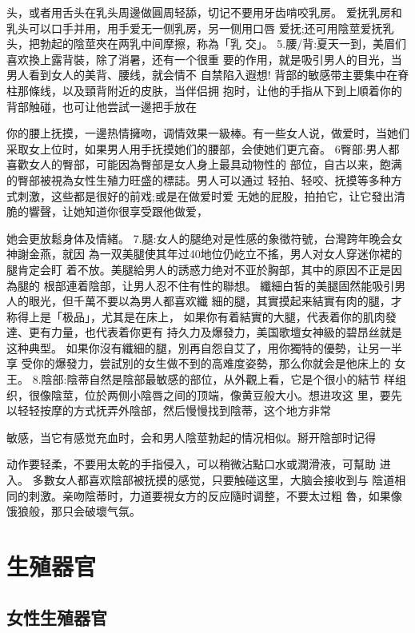 \documentclass[12pt,UTF8]{ctexbook}
\begin{document}
头，或者用舌头在乳头周邊做圓周轻舔，切记不要用牙齿啃咬乳房。
爱抚乳房和乳头可以口手并用，用手爱无一侧乳房，另一侧用口唇
爱抚;还可用陰莖爱抚乳头，把勃起的陰莖夾在两乳中间摩擦，称為「乳
交」。
5.腰/背:夏天一到，美眉们喜欢換上露背裝，除了消暑，还有一个很重
要的作用，就是吸引男人的目光，当男人看到女人的美背、腰线，就会情不
自禁陷入遐想!
背部的敏感带主要集中在脊柱那條线，以及頸背附近的皮肤，当伴侣拥
抱时，让他的手指从下到上順着你的背部触碰，也可让他尝試一邊把手放在

你的腰上抚摸，一邊热情擁吻，调情效果一級棒。有一些女人说，做爱时，当她们采取女上位时，如果男人用手抚摸她们的腰部，会使她们更亢奋。
6臀部:男人都喜歡女人的臀部，可能因為臀部是女人身上最具动物性的
部位，自古以来，飽满的臀部被視為女性生殖力旺盛的標誌。男人可以通过
轻拍、轻咬、抚摸等多种方式刺激，这些都是很好的前戏;或是在做爱时爱
无她的屁股，拍拍它，让它發出清脆的響聲，让她知道你很享受跟他做爱，

她会更放鬆身体及情緒。
7.腿:女人的腿绝对是性感的象徵符號，台灣跨年晚会女神謝金燕，就因
為一双美腿使其年过40地位仍屹立不搖，男人对女人穿迷你裙的腿肯定会盯
着不放。美腿給男人的誘惑力绝对不亚於胸部，其中的原因不正是因為腿的
根部連着陰部，让男人忍不住有性的聯想。
纖細白皙的美腿固然能吸引男人的眼光，但千萬不要以為男人都喜欢纖
細的腿，其實摸起来結實有肉的腿，才称得上是「极品」，尤其是在床上，
如果你有着結實的大腿，代表着你的肌肉發達、更有力量，也代表着你更有
持久力及爆發力，美国歌壇女神級的碧昂丝就是这种典型。
如果你沒有纖細的腿，別再自怨自艾了，用你獨特的優勢，让另一半享
受你的爆發力，尝試別的女生做不到的高难度姿勢，那么你就会是他床上的
女王。
8.陰部:陰蒂自然是陰部最敏感的部位，从外觀上看，它是个很小的結节
样组织，很像陰莖，位於两侧小陰唇之间的顶端，像黄豆般大小。想进攻这
里，要先以轻轻按摩的方式抚弄外陰部，然后慢慢找到陰蒂，这个地方非常

敏感，当它有感觉充血时，会和男人陰莖勃起的情况相似。掰开陰部时记得

动作要轻柔，不要用太乾的手指侵入，可以稍微沾點口水或潤滑液，可幫助
进入。
多數女人都喜欢陰部被抚摸的感觉，只要触碰这里，大脑会接收到与
陰道相同的刺激。亲吻陰蒂时，力道要視女方的反应隨时调整，不要太过粗
魯，如果像饿狼般，那只会破壞气氛。



\mainmatter

\part{生殖器官}

\chapter{女性生殖器官}
\end{document}
